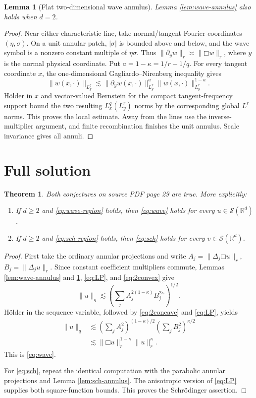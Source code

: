 \documentclass[11pt]{article}
\newtheorem{theorem}{Theorem}
\newtheorem{lemma}{Lemma}
\newcommand{\R}{\mathbb R}
\newcommand{\Sclass}{\mathcal S}
\newcommand{\Boxop}{\mathord\Box}
\begin{document}
\begin{lemma}[Flat two-dimensional wave annulus]\label{lem:flat}
Lemma \ref{lem:wave-annulus} also holds when $d=2$.
\end{lemma}

\begin{proof}
Near either characteristic line, take normal/tangent Fourier coordinates
$(\eta,\sigma)$.  On a unit annular patch, $|\sigma|$ is bounded above and
below, and the wave symbol is a nonzero constant multiple of $\eta\sigma$.
Thus $\|\partial_yw\|_r\asymp\|\Boxop w\|_r$, where $y$ is the normal physical
coordinate.  Put $a=1-\kappa=1/r-1/q$.  For every tangent coordinate $x$,
the one-dimensional Gagliardo--Nirenberg inequality gives
\[
 \|w(x,\cdot)\|_{L_y^q}
 \lesssim \|\partial_yw(x,\cdot)\|_{L_y^r}^{a}
          \|w(x,\cdot)\|_{L_y^r}^{1-a}.
\]
H\"older in $x$ and vector-valued Bernstein for the compact tangent-frequency
support bound the two resulting $L_x^q(L_y^r)$ norms by the corresponding
global $L^r$ norms.  This proves the local estimate.  Away from the lines use
the inverse-multiplier argument, and finite recombination finishes the unit
annulus.  Scale invariance gives all annuli.
\end{proof}

\section{Full solution}

\begin{theorem}\label{thm:main}
Both conjectures on source PDF page 29 are true.  More explicitly:
\begin{enumerate}
\item If $d\ge2$ and \eqref{eq:wave-region} holds, then \eqref{eq:wave} holds
for every $u\in\Sclass(\R^d)$.
\item If $d\ge2$ and \eqref{eq:sch-region} holds, then \eqref{eq:sch} holds
for every $v\in\Sclass(\R^d)$.
\end{enumerate}
\end{theorem}

\begin{proof}
First take the ordinary annular projections and write
$A_j=\|\Delta_j\Boxop u\|_r$, $B_j=\|\Delta_ju\|_r$.  Since constant
coefficient multipliers commute, Lemmas \ref{lem:wave-annulus} and
\ref{lem:flat}, \eqref{eq:LP}, and \eqref{eq:2convex} give
\[
 \|u\|_q
 \lesssim\left(\sum_j A_j^{2(1-\kappa)}B_j^{2\kappa}\right)^{1/2}.
\]
H\"older in the sequence variable, followed by \eqref{eq:2concave} and
\eqref{eq:LP}, yields
\begin{align*}
 \|u\|_q
 &\lesssim
 \left(\sum_jA_j^2\right)^{(1-\kappa)/2}
 \left(\sum_jB_j^2\right)^{\kappa/2}\\
 &\lesssim \|\Boxop u\|_r^{1-\kappa}\|u\|_r^\kappa.
\end{align*}
This is \eqref{eq:wave}.

For \eqref{eq:sch}, repeat the identical computation with the parabolic
annular projections and Lemma \ref{lem:sch-annulus}.  The anisotropic version
of \eqref{eq:LP} supplies both square-function bounds.  This proves the
Schr\"odinger assertion.
\end{proof}
\end{document}
